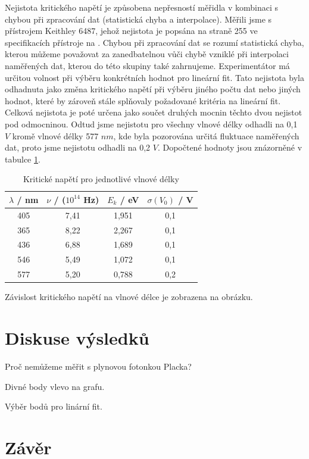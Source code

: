 Nejistota kritického napětí je způsobena nepřesností měřidla v kombinaci s chybou při zpracování dat (statistická chyba a interpolace). Měřili jsme s přístrojem Keithley 6487, jehož nejistota je popsána na straně 255 ve specifikacích přístroje na \cite{bib:pristroj}. Chybou při zpracování dat se rozumí statistická chyba, kterou můžeme považovat za zanedbatelnou vůči chybě vzniklé při interpolaci naměřených dat, kterou do této skupiny také zahrnujeme. Experimentátor má určitou volnost při výběru konkrétních hodnot pro lineární fit. Tato nejistota byla odhadnuta jako změna kritického napětí při výběru jiného počtu dat nebo jiných hodnot, které by zároveň stále splňovaly požadované kritéria na lineární fit. Celková nejistota je poté určena jako součet druhých mocnin těchto dvou nejistot pod odmocninou. Odtud jsme nejistotu pro všechny vlnové délky odhadli na 0,1 $V$ kromě vlnové délky 577 $nm$, kde byla pozorována určitá fluktuace naměřených dat, proto jsme nejistotu odhadli na 0,2 $V$. Dopočtené hodnoty jsou znázorněné v tabulce \ref{tab:krit-nap}.

\begin{table}[!h]
\centering
\caption{Kritické napětí pro jednotlivé vlnové délky}
\label{tab:krit-nap}
\begin{tabular}{cccc}
\hline
$\lambda$ / nm & $\nu$ / ($10^{14}$ Hz) & $E_k$ / eV & $\sigma(V_0)$ / V \\
\hline
405 & 7,41 & 1,951 & 0,1 \\
365 & 8,22 & 2,267 & 0,1 \\
436 & 6,88 & 1,689 & 0,1 \\
546 & 5,49 & 1,072 & 0,1 \\
577 & 5,20 & 0,788 & 0,2 \\
\hline
\end{tabular}
\end{table}

Závislost kritického napětí na vlnové délce je zobrazena na obrázku.



\section{Diskuse výsledků}

Proč nemůžeme měřit s plynovou fotonkou Placka?

Divné body vlevo na grafu.

Výběr bodů pro linární fit.

\section{Závěr}
